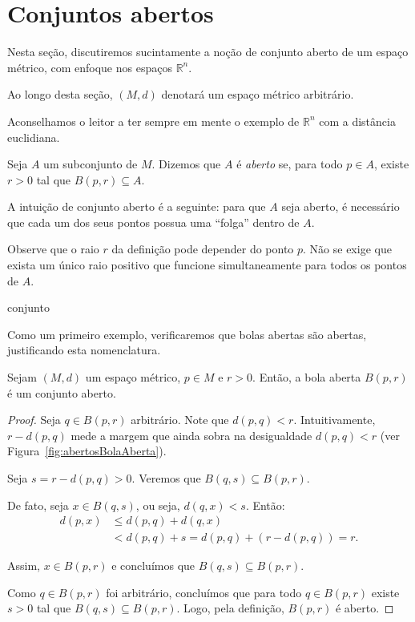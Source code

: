 \section{Conjuntos abertos}
Nesta seção, discutiremos sucintamente a noção de conjunto aberto de um espaço métrico, com enfoque nos espaços $\mathbb R^n$.

Ao longo desta seção, $(M,d)$ denotará um espaço métrico arbitrário.

Aconselhamos o leitor a ter sempre em mente o exemplo de $\mathbb R^n$ com a distância euclidiana.

\begin{definition}
    Seja $A$ um subconjunto de $M$.
    Dizemos que $A$ é \emph{aberto} se, para todo $p\in A$, existe $r>0$ tal que $B(p, r)\subseteq A$.
\end{definition}

A intuição de conjunto aberto é a seguinte: para que $A$ seja aberto, é necessário que cada um dos seus pontos possua uma ``folga'' dentro de $A$.

Observe que o raio $r$ da definição pode depender do ponto $p$.
Não se exige que exista um único raio positivo que funcione simultaneamente para todos os pontos de $A$.

{conjunto}

Como um primeiro exemplo, verificaremos que bolas abertas são abertas, justificando esta nomenclatura.

\begin{proposition}
    Sejam $(M,d)$ um espaço métrico, $p \in M$ e $r>0$.
    Então, a bola aberta $B(p, r)$ é um conjunto aberto.
\end{proposition}
\begin{proof}
    Seja $q \in B(p, r)$ arbitrário.
    Note que $d(p, q) < r$.
    Intuitivamente, $r-d(p,q)$ mede a margem que ainda sobra na desigualdade $d(p,q)<r$ (ver Figura~\ref{fig:abertosBolaAberta}).

    Seja $s = r - d(p, q) > 0$.
    Veremos que $B(q, s) \subseteq B(p, r)$.

    De fato, seja $x \in B(q, s)$, ou seja, $d(q, x) < s$.
    Então:
    \begin{align*}
        d(p, x) &\leq d(p, q) + d(q, x) \\
        &< d(p, q) + s = d(p, q) + (r - d(p, q)) = r.
    \end{align*}

    Assim, $x \in B(p, r)$ e concluímos que $B(q, s) \subseteq B(p, r)$.

    Como $q \in B(p, r)$ foi arbitrário, concluímos que para todo $q \in B(p, r)$ existe $s>0$ tal que $B(q, s)\subseteq B(p, r)$.
    Logo, pela definição, $B(p, r)$ é aberto.
\end{proof}

